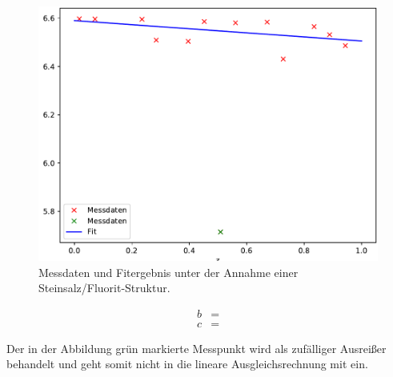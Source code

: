 \begin{figure}
  \centering
  \includegraphics[scale=0.75]{build/Salz_3.pdf}
  \caption{Messdaten und Fitergebnis unter der Annahme einer Steinsalz/Fluorit-Struktur.}
  \label{fig:SalzC2}
\end{figure}

\begin{align}
	b&=  \\
	c&= 
\end{align}

Der in der Abbildung grün markierte Messpunkt wird als zufälliger Ausreißer behandelt und geht somit nicht in die lineare Ausgleichsrechnung mit ein.








